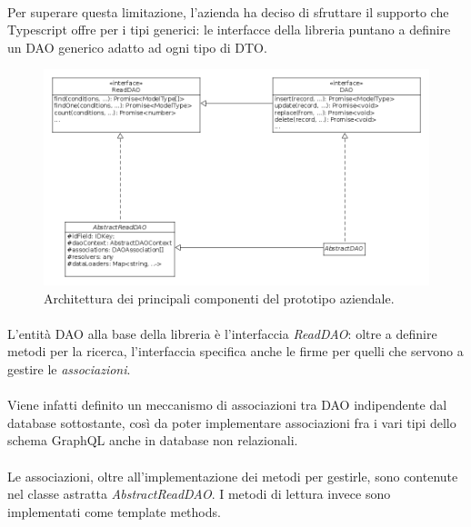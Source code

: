 \documentclass[a4paper, 12pt]{report}
\begin{document}
    \paragraph*{}
    Per superare questa limitazione, l'azienda ha deciso di sfruttare il supporto che Typescript offre per i tipi generici: le interfacce della libreria puntano a definire un DAO generico adatto ad ogni tipo di DTO.
    \begin{figure}[H]
      \includegraphics[width=\textwidth]{prototype-architecture.png}
      \caption{Architettura dei principali componenti del prototipo aziendale.}
    \end{figure}
    \paragraph*{}
    L'entità DAO alla base della libreria è l'interfaccia \emph{ReadDAO}: oltre a definire metodi per la ricerca, l'interfaccia specifica anche le firme per quelli che servono a gestire le \emph{associazioni}.
    \paragraph*{}
    Viene infatti definito un meccanismo di associazioni tra DAO indipendente dal database sottostante, così da poter implementare associazioni fra i vari tipi dello schema GraphQL anche in database non relazionali.
    \paragraph*{}
    Le associazioni, oltre all'implementazione dei metodi per gestirle, sono contenute nel classe astratta \emph{AbstractReadDAO}.
    I metodi di lettura invece sono implementati come template methods.
\end{document}
